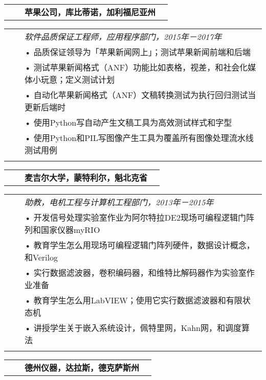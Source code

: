 \documentclass{minimal}
\begin{document}
\begin{CJK*}{UTF8}{gbsn}
\begin{tabular}{ p{1.5cm} p{1cm} p{10cm} >{\raggedleft\arraybackslash}p{3cm} }
& & \textbf{苹果公司，库比蒂诺，加利福尼亚州} & \\
\end{tabular}

\begin{tabular}{ p{1.5cm} p{1cm} p{16cm} }
& & \textit{软件品质保证工程师，应用程序部门，2015年－2017年}\\
& & • 品质保证领导为「苹果新闻网上」；测试苹果新闻前端和后端\\
& & • 测试苹果新闻格式（ANF）功能比如表格，视差，和社会化媒体小玩意；定义测试计划\\
& & • 自动化苹果新闻格式（ANF）文稿转换测试为执行回归测试当更新后端时\\
& & • 使用Python写自动产生文稿工具为高效测试样式和字型\\
& & • 使用Python和PIL写图像产生工具为覆盖所有图像处理流水线测试用例\\
& & \\
\end{tabular}

\pagebreak

\begin{tabular}{ p{1.5cm} p{1cm} p{10cm} >{\raggedleft\arraybackslash}p{3cm} }
& & \textbf{麦吉尔大学，蒙特利尔，魁北克省} & \\
\end{tabular}

\begin{tabular}{ p{1.5cm} p{1cm} p{16cm} }
& & \textit{助教，电机工程与计算机工程部门，2013年－2015年}\\
& & • 开发信号处理实验室作业为阿尔特拉DE2现场可编程逻辑门阵列和国家仪器myRIO\\
& & • 教育学生怎么用现场可编程逻辑门阵列硬件，数据设计概念，和Verilog\\
& & • 实行数据滤波器，卷积编码器，和维特比解码器作为实验室作业准备\\
& & • 教育学生怎么用LabVIEW；使用它实行数据滤波器和有限状态机\\
& & • 讲授学生关于嵌入系统设计，佩特里网，Kahn网，和调度算法\\
& & \\
\end{tabular}

\begin{tabular}{ p{1.5cm} p{1cm} p{10cm} >{\raggedleft\arraybackslash}p{3cm} }
& & \textbf{德州仪器，达拉斯，德克萨斯州} & \\
\end{tabular}


\end{CJK*}
\end{document}
